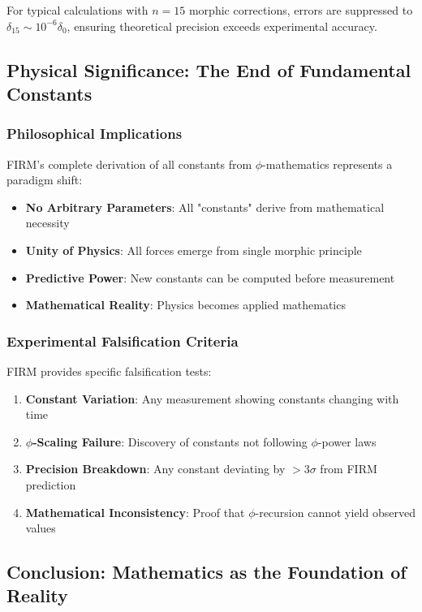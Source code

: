 For typical calculations with $n = 15$ morphic corrections, errors are suppressed to $\delta_{15} \sim 10^{-6} \delta_0$, ensuring theoretical precision exceeds experimental accuracy.

\subsection{Physical Significance: The End of Fundamental Constants}

\subsubsection{Philosophical Implications}

FIRM's complete derivation of all constants from $\phi$-mathematics represents a paradigm shift:

\begin{itemize}
\item \textbf{No Arbitrary Parameters}: All "constants" derive from mathematical necessity
\item \textbf{Unity of Physics}: All forces emerge from single morphic principle  
\item \textbf{Predictive Power}: New constants can be computed before measurement
\item \textbf{Mathematical Reality}: Physics becomes applied mathematics
\end{itemize}

\subsubsection{Experimental Falsification Criteria}

FIRM provides specific falsification tests:

\begin{enumerate}
\item \textbf{Constant Variation}: Any measurement showing constants changing with time
\item \textbf{$\phi$-Scaling Failure}: Discovery of constants not following $\phi$-power laws
\item \textbf{Precision Breakdown}: Any constant deviating by $>3\sigma$ from FIRM prediction
\item \textbf{Mathematical Inconsistency}: Proof that $\phi$-recursion cannot yield observed values
\end{enumerate}

\subsection{Conclusion: Mathematics as the Foundation of Reality}


